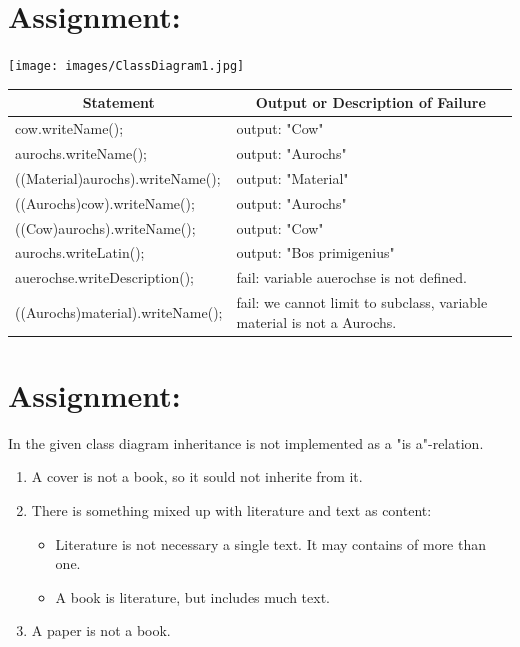 \documentclass[a4paper,12pt,oneside]{scrreprt}
\begin{document}
	\setcounter{chapter}{2} %
	\section{Assignment:}
	
    \texttt{[image: images/ClassDiagram1.jpg]}
    
	\begin{table}[h]
		\centering
		\resizebox{\textwidth}{!}
		{%
			\begin{tabular}{|l|l|}
				\hline
				\multicolumn{1}{|c|}{\textbf{Statement}} & \multicolumn{1}{c|}{\textbf{Output or Description of Failure}} \\ \hline
				cow.writeName();                         & output: "Cow"         \\ \hline
				aurochs.writeName();                     & output: "Aurochs"     \\ \hline
				((Material)aurochs).writeName();         & output: "Material"    \\ \hline
				((Aurochs)cow).writeName();              & output: "Aurochs"     \\ \hline
				((Cow)aurochs).writeName();              & output: 
                "Cow"         \\ \hline
				aurochs.writeLatin();                    & output: "Bos primigenius"  \\ \hline
				auerochse.writeDescription();              & fail:
                variable auerochse is not defined.      \\ \hline
				((Aurochs)material).writeName();         & fail: we cannot limit to subclass, variable material is not a Aurochs.
				                                                                 \\ \hline
			\end{tabular}
		}
	\end{table}
	
	\section{Assignment:}
    
    In the given class diagram inheritance is not implemented as a "is a"-relation. 
    
    \begin{enumerate}
        \item A cover is not a book, so it sould not inherite from it.
        \item There is something mixed up with literature and text as content:
        \begin{itemize}
            \item Literature is not necessary a single text. It may contains of more than one.
            \item A book is literature, but includes much text.
        \end{itemize}
        \item A paper is not a book.
    \end{enumerate}
\end{document}
